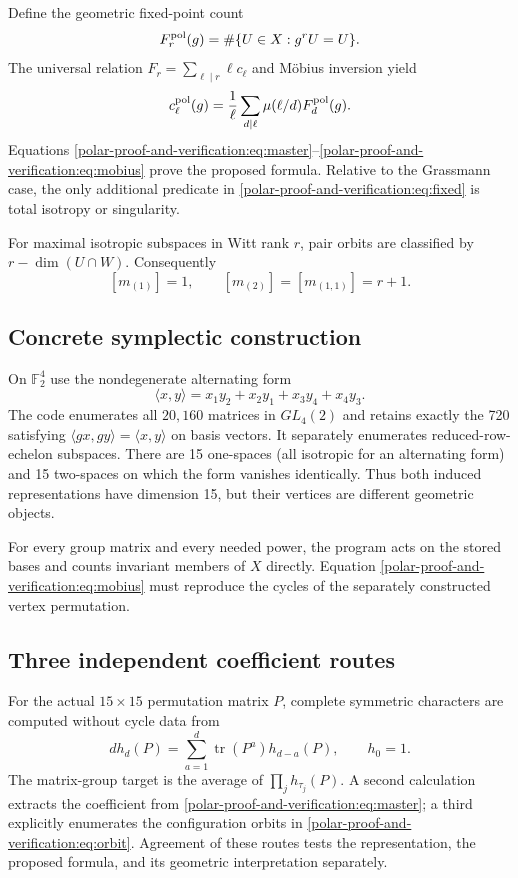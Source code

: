 \documentclass[10pt]{article}
\begin{document}
Define the geometric fixed-point count
\begin{equation}\label{polar-proof-and-verification:eq:fixed}
F_r^{\rm pol}(g)=\#\{U\in X:g^rU=U\}.
\end{equation}
The universal relation $F_r=\sum_{\ell\mid r}\ell c_\ell$ and Möbius
inversion yield
\begin{equation}\label{polar-proof-and-verification:eq:mobius}
c_\ell^{\rm pol}(g)=\frac1\ell\sum_{d\mid\ell}
\mu(\ell/d)F_d^{\rm pol}(g).
\end{equation}
Equations \eqref{polar-proof-and-verification:eq:master}--\eqref{polar-proof-and-verification:eq:mobius} prove the proposed formula.
Relative to the Grassmann case, the only additional predicate in
\eqref{polar-proof-and-verification:eq:fixed} is total isotropy or singularity.

For maximal isotropic subspaces in Witt rank $r$, pair orbits are classified
by $r-\dim(U\cap W)$.  Consequently
\[
[m_{(1)}]=1,\qquad [m_{(2)}]=[m_{(1,1)}]=r+1.
\]

\subsection{Concrete symplectic construction}
On $\mathbb F_2^4$ use the nondegenerate alternating form
\[
\langle x,y\rangle=x_1y_2+x_2y_1+x_3y_4+x_4y_3.
\]
The code enumerates all $20{,}160$ matrices in $GL_4(2)$ and retains exactly
the 720 satisfying $\langle gx,gy\rangle=\langle x,y\rangle$ on basis
vectors.  It separately enumerates reduced-row-echelon subspaces.  There are
15 one-spaces (all isotropic for an alternating form) and 15 two-spaces on
which the form vanishes identically.  Thus both induced representations have
dimension 15, but their vertices are different geometric objects.

For every group matrix and every needed power, the program acts on the stored
bases and counts invariant members of $X$ directly.  Equation
\eqref{polar-proof-and-verification:eq:mobius} must reproduce the cycles of the separately constructed
vertex permutation.

\subsection{Three independent coefficient routes}
For the actual $15\times15$ permutation matrix $P$, complete symmetric
characters are computed without cycle data from
\[
d h_d(P)=\sum_{a=1}^d\operatorname{tr}(P^a)h_{d-a}(P),\qquad h_0=1.
\]
The matrix-group target is the average of $\prod_jh_{\tau_j}(P)$.  A second
calculation extracts the coefficient from \eqref{polar-proof-and-verification:eq:master}; a third explicitly
enumerates the configuration orbits in \eqref{polar-proof-and-verification:eq:orbit}.  Agreement of these
routes tests the representation, the proposed formula, and its geometric
interpretation separately.
\end{document}
